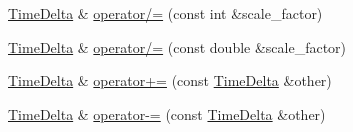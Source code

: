 \begin{DoxyCompactItemize}
\hyperlink{structTimeDelta}{\-Time\-Delta} \& \hyperlink{structTimeDelta_ac3180211824572ea2f198ca1ad6887c9}{operator/=} (const int \&scale\-\_\-factor)
\item 
\hyperlink{structTimeDelta}{\-Time\-Delta} \& \hyperlink{structTimeDelta_ae514c2f5fa4266b53bb0220b89e50e54}{operator/=} (const double \&scale\-\_\-factor)
\item 
\hyperlink{structTimeDelta}{\-Time\-Delta} \& \hyperlink{structTimeDelta_ae8d415b1d359e1f6c6a68ee3c44ea21e}{operator+=} (const \hyperlink{structTimeDelta}{\-Time\-Delta} \&other)
\item 
\hyperlink{structTimeDelta}{\-Time\-Delta} \& \hyperlink{structTimeDelta_adcacf2fa162c98c9a8c7278f0e32ce56}{operator-\/=} (const \hyperlink{structTimeDelta}{\-Time\-Delta} \&other)
\end{DoxyCompactItemize}
